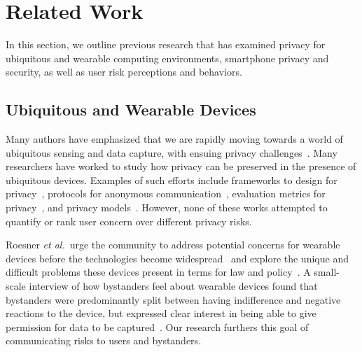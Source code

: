 
\section{Related Work}
In this section, we outline previous research that has examined privacy for ubiquitous and wearable computing environments, smartphone privacy and security, as well as user risk perceptions and behaviors.

\subsection{Ubiquitous and Wearable Devices}
Many authors have emphasized that we are rapidly moving towards a world of ubiquitous sensing and data capture, with ensuing privacy challenges~\cite{abowd2000charting,palen2003unpacking,camp2000internet}. Many researchers have worked to study how privacy can be preserved in the presence of ubiquitous devices. Examples of such efforts include frameworks to design for privacy~\cite{bellotti1993design,camp2003designing,langheinrich2001privacy}, protocols for anonymous communication~\cite{cornelius2008anonysense}, evaluation metrics for privacy~\cite{scholtz2004toward}, and privacy models~\cite{hong2004privacy, jiang2002approximate}. However, none of these works attempted to quantify or rank user concern over different privacy risks. 

Roesner {\it et al.}\ urge the community to address potential concerns for wearable devices before the technologies become widespread~\cite{roesner2014security} and explore the unique and difficult problems these devices present in terms for law and policy~\cite{roesner2014augmented}. A small-scale interview of how bystanders feel about wearable devices found that bystanders were predominantly split between having indifference and negative reactions to the device, but expressed clear interest in being able to give permission for data to be captured~\cite{denning2014situ}. Our research furthers this goal of communicating risks to users and bystanders. 

